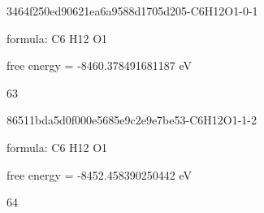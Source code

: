 \documentclass{article}
\begin{document}
\vspace{1cm}


3464f250ed90621ea6a9588d1705d205-C6H12O1-0-1



formula: C6 H12 O1



free energy = -8460.378491681187 eV

63

\vspace{1cm}


86511bda5d0f000e5685e9c2e9e7be53-C6H12O1-1-2



formula: C6 H12 O1



free energy = -8452.458390250442 eV

64
\end{document}
